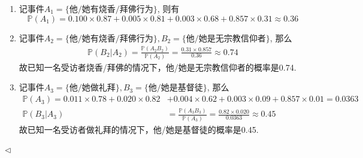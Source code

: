 \documentclass[11pt]{article}
\newenvironment{answer}[1][Solution]{\begin{trivlist}
\item[\hskip \labelsep {\bfseries #1.}\hskip \labelsep]}{\hfill$\lhd$\end{trivlist}}
\newcommand\1{\mathds{1}}
\newcommand\PP{\mathbb{P}}
\begin{document}
\begin{answer}
    \begin{enumerate}[label=(\arabic*)]
        \item 记事件$A_1 = \{\text{他/她有烧香/拜佛行为}\}$, 则有\[\PP(A_1) = 0.100 \times 0.87 + 0.005 \times 0.81 + 0.003 \times 0.68 + 0.857 \times 0.31 \approx 0.36\]
        \item 记事件$A_2 = \{\text{他/她有烧香/拜佛行为}\}, B_2 = \{\text{他/她是无宗教信仰者}\}$, 那么\begin{align*}
            \PP(B_2|A_2) = \frac{\PP(A_2 B_2)}{\PP(A_2)} = \frac{0.31 \times 0.857}{0.36} \approx 0.74
        \end{align*}
        故已知一名受访者烧香/拜佛的情况下，他/她是无宗教信仰者的概率是0.74.
        \item 记事件$A_3 = \{\text{他/她做礼拜}\}, B_3 = \{\text{他/她是基督徒}\}$, 那么\begin{align*}
            \PP(A_3) =  0.011 \times 0.78 + 0.020 \times 0.82 &+ 0.004 \times 0.62 + 0.003 \times 0.09 + 0.857 \times 0.01 = 0.0363 \\
            \PP(B_3|A_3) &= \frac{\PP(A_3 B_3)}{\PP(A_3)} = \frac{0.82 \times 0.020}{0.0363} \approx 0.45
        \end{align*}
        故已知一名受访者做礼拜的情况下，他/她是基督徒的概率是0.45.
    \end{enumerate}
\end{answer}
\end{document}
